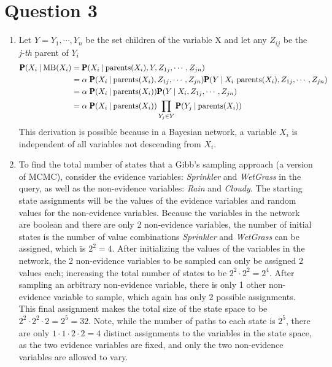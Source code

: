 \documentclass[a4paper, 12pt, one column, aas_macros]{article}
\newcommand\given[1][]{\:#1\vert\:}
\begin{document}
\section*{Question 3}
	\begin{enumerate}[label=\alph*]
    	\item
        	Let $Y = Y_{1}, \cdots, Y_{n}$ be the set children of the variable X and let any $Z_{ij}$ be the \textit{j-th} parent of $Y_{i}$
            \begin{align*}
             \text{\pmb{P}}(X_{i} \given \text{MB}(X_{i}) &= \text{\pmb{P}}(X_{i} \given \text{parents}(X_{i}), Y, Z_{1j}, \cdots, Z_{jn}) \\ 
             &= \alpha \text{ \pmb{P}}(X_{i} \given \text{parents}(X_{i}), Z_{1j}, \cdots, Z_{jn}) \text{\pmb{P}}(Y \given X_{i}\text{ parents}(X_{i}), Z_{1j}, \cdots, Z_{jn}) \\
             &= \alpha \text{ \pmb{P}}(X_{i} \given \text{parents}(X_{i})) \text{\pmb{P}}(Y \given X_{i}, Z_{1j}, \cdots, Z_{jn}) \\
             &= \alpha \text{ \pmb{P}}(X_{i} \given \text{parents}(X_{i}))\prod_{Y_{j} \in Y}\text{\pmb{P}}(Y_{j} \given \text{parents}(X_{i}))
            \end{align*}
            This derivation is possible because in a Bayesian network, a variable $X_{i}$ is independent of all variables not descending from $X_{i}$.
        \item
        To find the total number of states that a Gibb's sampling approach (a version of MCMC), consider the evidence variables: \textit{Sprinkler} and \textit{WetGrass} in the query, as well as the non-evidence variables: \textit{Rain} and \textit{Cloudy}. The starting state assignments will be the values of the evidence variables and random values for the non-evidence variables. Because the variables in the network are boolean and there are only 2 non-evidence variables, the number of initial states is the number of value combinations \textit{Sprinkler} and \textit{WetGrass} can be assigned, which is $2^{2} = 4$. After initializing the values of the variables in the network, the 2 non-evidence variables to be sampled can only be assigned 2 values each; increasing the total number of states to be $2^{2} \cdot 2^{2} = 2^{4}$. After sampling an arbitrary non-evidence variable, there is only 1 other non-evidence variable to sample, which again has only 2 possible assignments. This final assignment makes the total size of the state space to be $2^{2} \cdot 2^{2} \cdot 2 = 2^{5} = 32$. Note, while the number of paths to each state is $2^{5}$, there are only $1 \cdot 1 \cdot 2 \cdot 2 = 4$ distinct assignments to the variables in the state space, as the two evidence variables are fixed, and only the two non-evidence variables are allowed to vary.

\end{enumerate}
\end{document}
